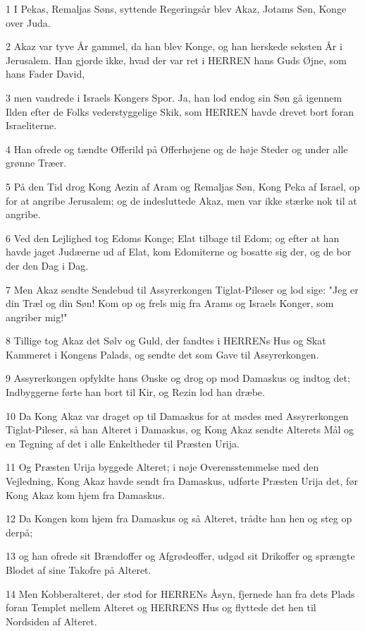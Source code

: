\par 1 I Pekas, Remaljas Søns, syttende Regeringsår blev Akaz, Jotams Søn, Konge over Juda.
\par 2 Akaz var tyve År gammel, da han blev Konge, og han herskede seksten År i Jerusalem. Han gjorde ikke, hvad der var ret i HERREN hans Guds Øjne, som hans Fader David,
\par 3 men vandrede i Israels Kongers Spor. Ja, han lod endog sin Søn gå igennem Ilden efter de Folks vederstyggelige Skik, som HERREN havde drevet bort foran Israeliterne.
\par 4 Han ofrede og tændte Offerild på Offerhøjene og de høje Steder og under alle grønne Træer.
\par 5 På den Tid drog Kong Aezin af Aram og Remaljas Søn, Kong Peka af Israel, op for at angribe Jerusalem; og de indesluttede Akaz, men var ikke stærke nok til at angribe.
\par 6 Ved den Lejlighed tog Edoms Konge; Elat tilbage til Edom; og efter at han havde jaget Judæerne ud af Elat, kom Edomiterne og bosatte sig der, og de bor der den Dag i Dag.
\par 7 Men Akaz sendte Sendebud til Assyrerkongen Tiglat-Pileser og lod sige: "Jeg er din Træl og din Søn! Kom op og frels mig fra Arams og Israels Konger, som angriber mig!"
\par 8 Tillige tog Akaz det Sølv og Guld, der fandtes i HERRENs Hus og Skat Kammeret i Kongens Palads, og sendte det som Gave til Assyrerkongen.
\par 9 Assyrerkongen opfyldte hans Ønske og drog op mod Damaskus og indtog det; Indbyggerne førte han bort til Kir, og Rezin lod han dræbe.
\par 10 Da Kong Akaz var draget op til Damaskus for at mødes med Assyrerkongen Tiglat-Pileser, så han Alteret i Damaskus, og Kong Akaz sendte Alterets Mål og en Tegning af det i alle Enkeltheder til Præsten Urija.
\par 11 Og Præsten Urija byggede Alteret; i nøje Overensstemmelse med den Vejledning, Kong Akaz havde sendt fra Damaskus, udførte Præsten Urija det, før Kong Akaz kom hjem fra Damaskus.
\par 12 Da Kongen kom hjem fra Damaskus og så Alteret, trådte han hen og steg op derpå;
\par 13 og han ofrede sit Brændoffer og Afgrødeoffer, udgød sit Drikoffer og sprængte Blodet af sine Takofre på Alteret.
\par 14 Men Kobberalteret, der stod for HERRENs Åsyn, fjernede han fra dets Plads foran Templet mellem Alteret og HERRENS Hus og flyttede det hen til Nordsiden af Alteret.
